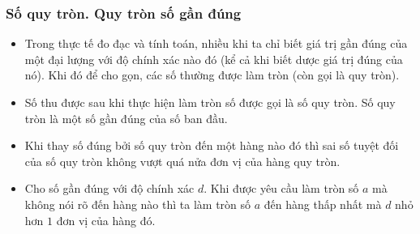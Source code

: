 \subsubsection{Số quy tròn. Quy tròn số gần đúng}
\iconMT {}
\begin{boxdn}
	\begin{itemize}
		\item Trong thực tế đo đạc và tính toán, nhiều khi ta chỉ biết giá trị gần đúng của một đại lượng với độ chính xác nào đó (kể cả khi biết dược giá trị đúng của nó). Khi đó để cho gọn, các số thường được làm tròn (còn gọi là quy tròn).
		\item Số thu được sau khi thực hiện làm tròn số được gọi là số quy tròn. Số quy tròn là một số gần đúng của số ban đầu.
	\end{itemize}
\end{boxdn}
\iconMT {}
\begin{nx}
	\begin{itemize}
		\item Khi thay số đúng bởi số quy tròn đến một hàng nào đó thì sai số tuyệt đối của số quy tròn không vượt quá nửa đơn vị của hàng quy tròn.
		\item Cho số gần đúng với độ chính xác $d$. Khi được yêu cầu làm tròn số $a$ mà không nói rõ đến hàng nào thì ta làm tròn số $a$ đến hàng thấp nhất mà $d$ nhỏ hơn $1$ đơn vị của hàng đó.
	\end{itemize}
\end{nx}
